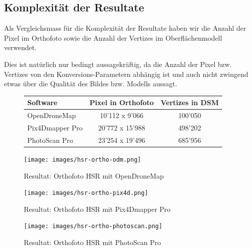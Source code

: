 \subsection{Komplexität der Resultate}

Als Vergleichsmass für die Komplexität der Resultate haben wir die Anzahl der
Pixel im Orthofoto sowie die Anzahl der Vertizes im Oberflächenmodell verwendet.

Dies ist natürlich nur bedingt aussagekräftig, da die Anzahl der Pixel bzw.
Vertizes von den Konversions-Parametern abhängig ist und auch nicht zwingend
etwas über die Qualität des Bildes bzw. Modells aussagt.

\begin{figure}[H]
	\begin{tabularx}{\textwidth}[H]{Xcc}
		\toprule
		\textbf{Software} & \textbf{Pixel in Orthofoto} & \textbf{Vertizes in DSM} \\
		\midrule
		OpenDroneMap & 10'112 x 9'066 & 100'050 \\
		Pix4Dmapper Pro & 20'772 x 15'988 & 498'202 \\
		PhotoScan Pro & 23'254 x 19'496 & 685'956 \\
		\bottomrule
	\end{tabularx}
\end{figure}


\begin{figure}[p]
	\centerline{
		\texttt{[image: images/hsr-ortho-odm.png]}
	}
	\caption{Resultat: Orthofoto HSR mit OpenDroneMap}
	\label{img:hsr-ortho-odm}
\end{figure}

\begin{figure}[p]
	\centerline{
		\texttt{[image: images/hsr-ortho-pix4d.png]}
	}
	\caption{Resultat: Orthofoto HSR mit Pix4Dmapper Pro}
	\label{img:hsr-ortho-pix4d}
\end{figure}

\begin{figure}[p]
	\centerline{
		\texttt{[image: images/hsr-ortho-photoscan.png]}
	}
	\caption{Resultat: Orthofoto HSR mit PhotoScan Pro}
	\label{img:hsr-ortho-pix4d}
\end{figure}


